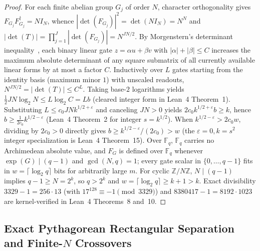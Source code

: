 \documentclass[11pt,a4paper]{article}
\theoremstyle{definition}
\theoremstyle{remark}
\newcommand{\ZZ}{\mathbb{Z}}
\newcommand{\FF}{\mathbb{F}}
\begin{document}
\begin{proof}
For each finite abelian group $G_j$ of order $N$, character orthogonality gives $F_{G_j} F_{G_j}^\dagger = N I_N$, whence $|\det(F_{G_j})|^2 = \det(N I_N) = N^N$ and $|\det(T)| = \prod_{j=1}^J |\det(F_{G_j})| = N^{JN/2}$. By Morgenstern's determinant inequality~\cite{morgenstern1973note}, each binary linear gate $z = \alpha u + \beta v$ with $|\alpha|+|\beta| \le C$ increases the maximum absolute determinant of any square submatrix of all currently available linear forms by at most a factor $C$. Inductively over $L$ gates starting from the identity basis (maximum minor $1$) with unscaled readouts, $N^{JN/2} = |\det(T)| \le C^L$. Taking base-$2$ logarithms yields $\frac{1}{2} J N \log_2 N \le L \log_2 C = L b$ (cleared integer form in Lean~4 Theorem~1). Substituting $L \le c_0 J N k^{1/2+\varepsilon}$ and canceling $J N > 0$ yields $2 c_0 k^{1/2+\varepsilon} b \ge k$, hence $b \ge \frac{1}{2c_0} k^{1/2-\varepsilon}$ (Lean~4 Theorem~2 for integer $s = k^{1/2}$). When $k^{1/2-\varepsilon} > 2 c_0 w$, dividing by $2 c_0 > 0$ directly gives $b \ge k^{1/2-\varepsilon}/(2c_0) > w$ (the $\varepsilon = 0, k = s^2$ integer specialization is Lean~4 Theorem~15). Over $\FF_q$, $\FF_q$ carries no Archimedean absolute value, and $F_G$ is defined over $\FF_q$ whenever $\exp(G) \mid (q-1)$ and $\gcd(N, q) = 1$; every gate scalar in $\{0,\dots,q-1\}$ fits in $w = \lceil \log_2 q\rceil$ bits for arbitrarily large $m$. For cyclic $\ZZ/N\ZZ$, $N \mid (q-1)$ implies $q - 1 \ge N = 2^k$, so $q > 2^k$ and $w = \lceil\log_2 q\rceil \ge k + 1 > k$. Exact divisibility $3329 - 1 = 256 \cdot 13$ (with $17^{128} \equiv -1 \pmod{3329}$) and $8380417 - 1 = 8192 \cdot 1023$ are kernel-verified in Lean~4 Theorems~8 and~10.
\end{proof}

\subsection{Exact Pythagorean Rectangular Separation and Finite-\texorpdfstring{$N$}{N} Crossovers}
\end{document}
